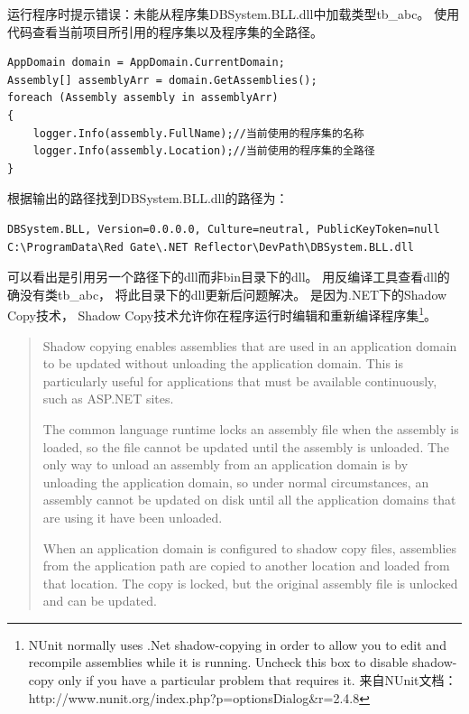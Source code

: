 \documentclass{book}
\begin{document}
运行程序时提示错误：未能从程序集DBSystem.BLL.dll中加载类型tb\_abc。
使用代码查看当前项目所引用的程序集以及程序集的全路径。

\begin{lstlisting}[language={[Sharp]C}]
AppDomain domain = AppDomain.CurrentDomain;
Assembly[] assemblyArr = domain.GetAssemblies();
foreach (Assembly assembly in assemblyArr)
{
    logger.Info(assembly.FullName);//当前使用的程序集的名称
    logger.Info(assembly.Location);//当前使用的程序集的全路径
}
\end{lstlisting}

根据输出的路径找到DBSystem.BLL.dll的路径为：

\begin{lstlisting}
DBSystem.BLL, Version=0.0.0.0, Culture=neutral, PublicKeyToken=null
C:\ProgramData\Red Gate\.NET Reflector\DevPath\DBSystem.BLL.dll
\end{lstlisting}

可以看出是引用另一个路径下的dll而非bin目录下的dll。
用反编译工具查看dll的确没有类tb\_abc，
将此目录下的dll更新后问题解决。
是因为.NET下的Shadow Copy技术，
Shadow Copy技术允许你在程序运行时编辑和重新编译程序集\footnote{NUnit normally uses .Net shadow-copying in order to allow you to edit and recompile assemblies while it is running. 
Uncheck this box to disable shadow-copy only if you have a particular problem that requires it.
来自NUnit文档：http://www.nunit.org/index.php?p=optionsDialog\&r=2.4.8}。

\begin{quote}
Shadow copying enables assemblies that are used in an application domain to be updated without unloading the application domain. This is particularly useful for applications that must be available continuously, such as ASP.NET sites.

The common language runtime locks an assembly file when the assembly is loaded, so the file cannot be updated until the assembly is unloaded. The only way to unload an assembly from an application domain is by unloading the application domain, so under normal circumstances, an assembly cannot be updated on disk until all the application domains that are using it have been unloaded.

When an application domain is configured to shadow copy files, assemblies from the application path are copied to another location and loaded from that location. The copy is locked, but the original assembly file is unlocked and can be updated.
\end{quote}
\end{document}
